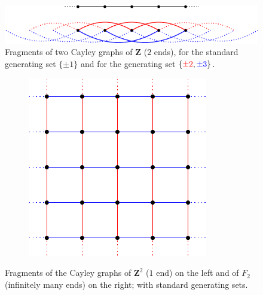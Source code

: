 \documentclass[a4paper]{article}
\theoremstyle{definition}
\theoremstyle{remark}
\newcommand*{\field}[1]{\mathbf{#1}}
\newcommand*{\Z}{\field{Z}}
\begin{document}
%
%
\begin{figure}[htbp]\centering
\includegraphics{CayleyOfZ}
\caption{Fragments of two Cayley graphs of $\Z$ ($2$ ends), for the standard generating set $\{\pm1\}$ and for the generating set $\{\textcolor{red}{\pm2},\textcolor{blue}{\pm3}\}$.}
\label{Figure:CayleyOfZ}
\end{figure}
%
%
%
%
%
\begin{figure}[htbp]\centering
\begin{subfigure}{0.5\textwidth}
\centering
\includegraphics{CayleyOfZ2}
\end{subfigure}%
%	
%
%
\begin{subfigure}{0.5\textwidth}
\centering
{}
\end{subfigure}
\caption{Fragments of the Cayley graphs of $\Z^2$ ($1$ end) on the left and of $F_2$ (infinitely many ends) on the right; with standard generating sets.}
\label{Figure:CayleyOfZ2}
\end{figure}
\end{document}
